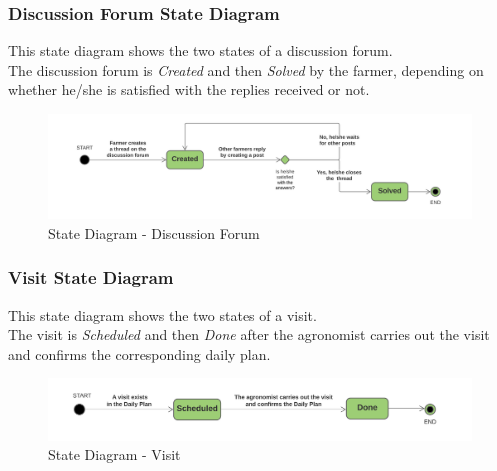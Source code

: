 \subsubsection{Discussion Forum State Diagram}
This state diagram shows the two states of a discussion forum.\\
The discussion forum is \textit{Created} and then \textit{Solved} by the farmer, depending on whether he/she is satisfied with the replies received or not.
\begin{figure}[h!]
  \includegraphics[width=\textwidth,height=\textheight,keepaspectratio]{./Images/State Chart DiscussionForum.png}
  \caption{State Diagram - Discussion Forum}
\end{figure}

\subsubsection{Visit State Diagram}
This state diagram shows the two states of a visit.\\
The visit is \textit{Scheduled} and then \textit{Done} after the agronomist carries out the visit and confirms the corresponding daily plan.
\begin{figure}[h!]
  \includegraphics[width=\textwidth,height=\textheight,keepaspectratio]{./Images/State Chart Visit.png}
  \caption{State Diagram - Visit}
\end{figure}
